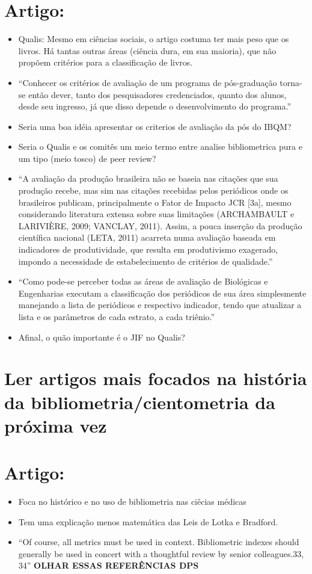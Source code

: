 \documentclass[11pt]{article}
\begin{document}
\section{Artigo: \cite{mugnaini2014}}
\label{sec:org74f7f63}
\begin{itemize}
\item Qualis: Mesmo em ciências sociais, o artigo costuma ter mais peso que os livros. Há tantas outras áreas (ciência dura, em sua maioria), que não propõem critérios para a classificação de livros.
\item ``Conhecer os critérios de avaliação de um programa de pós-graduação torna-se então dever, tanto dos pesquisadores credenciados, quanto dos alunos, desde seu ingresso, já que disso depende o desenvolvimento do programa.''
\item Seria uma boa idéia apresentar os criterios de avaliação da pós do IBQM?
\item Seria o Qualis e os comitês um meio termo entre analise bibliometrica pura e um tipo (meio tosco) de peer review?
\item ``A avaliação da produção brasileira não se baseia nas citações que sua produção recebe, mas sim nas citações recebidas pelos periódicos onde os brasileiros publicam, principalmente o Fator de Impacto JCR [3a], mesmo considerando literatura extensa sobre suas limitações (ARCHAMBAULT e LARIVIÈRE, 2009; VANCLAY, 2011). Assim, a pouca inserção da produção científica nacional (LETA, 2011) acarreta numa avaliação baseada em indicadores de produtividade, que resulta em produtivismo exagerado, impondo a necessidade de estabelecimento de critérios de qualidade.''
\item ``Como pode-se perceber todas as áreas de avaliação de Biológicas e Engenharias executam a classificação dos periódicos de sua área simplesmente manejando a lista de periódicos e respectivo indicador, tendo que atualizar a lista e os parâmetros de cada estrato, a cada triênio.''
\item Afinal, o quão importante é o JIF no Qualis?
\end{itemize}


\section{Ler artigos mais focados na história da bibliometria/cientometria da próxima vez}
\label{sec:orgde9d6ca}

\section{Artigo: \cite{thompson2015}}
\label{sec:orga62eff3}
\begin{itemize}
\item Foca no histórico e no uso de bibliometria nas ciêcias médicas
\item Tem uma explicação menos matemática das Leis de Lotka e Bradford.
\item ``Of course, all metrics must be used in context. Bibliometric indexes should generally be used in concert with a thoughtful review by senior colleagues.33, 34'' \textbf{OLHAR ESSAS REFERÊNCIAS DPS}
\end{itemize}
\end{document}
